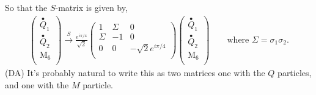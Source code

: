 \documentclass[12pt,a4paper]{article}
\newcounter{arrow}
\newcommand{\dave}[1]{{\color{ao(english)}\footnotesize{(DA) #1}}}
\begin{document}
So that the $S$-matrix is given by,
\begin{align}
\left( \begin{matrix}
\stackrel{\bullet}{Q}_{1}\\
\stackrel{\bullet}{Q}_{2}\\
\text{M}_6 \\ 
\end{matrix} \right) \xrightarrow{S}
\frac{e^{i \pi /4}}{\sqrt{2}}\left( \begin{matrix} 
1&\Sigma &0 \\
\Sigma &-1&0\\
0&0& -\sqrt{2} e^{i \pi /4}\\
\end{matrix} \right)
\left( \begin{matrix}
\stackrel{\bullet}{Q}_{1}\\
\stackrel{\bullet}{Q}_{2}\\
\text{M}_6 \\ 
\end{matrix} \right)
\quad \quad \text{where $\Sigma = \sigma_1 \sigma_2$.}
\end{align}
\dave{It's probably natural to write this as two matrices one with the $Q$ particles, and one with the $M$ particle.}
\end{document}
